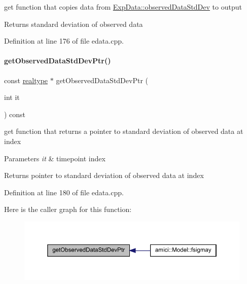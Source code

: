 get function that copies data from \mbox{\hyperlink{classamici_1_1_exp_data_aa097568cebb4be48c4c1dfaab0c2a159}{Exp\+Data\+::observed\+Data\+Std\+Dev}} to output

\begin{DoxyReturn}{Returns}
standard deviation of observed data 
\end{DoxyReturn}


Definition at line 176 of file edata.\+cpp.

\mbox{\label{classamici_1_1_exp_data_ad0ca0d6d8d5b6bb5587570d70bd3a4fc}} 
\paragraph{\texorpdfstring{get\+Observed\+Data\+Std\+Dev\+Ptr()}{getObservedDataStdDevPtr()}}
{\footnotesize\ttfamily const \mbox{\hyperlink{namespaceamici_a1bdce28051d6a53868f7ccbf5f2c14a3}{realtype}} $\ast$ get\+Observed\+Data\+Std\+Dev\+Ptr (\begin{DoxyParamCaption}\item[{int}]{it }\end{DoxyParamCaption}) const}

get function that returns a pointer to standard deviation of observed data at index


\begin{DoxyParams}{Parameters}
{\em it} & timepoint index \\
\hline
\end{DoxyParams}
\begin{DoxyReturn}{Returns}
pointer to standard deviation of observed data at index 
\end{DoxyReturn}


Definition at line 180 of file edata.\+cpp.

Here is the caller graph for this function\+:
\nopagebreak
\begin{figure}[H]
\begin{center}
\leavevmode
\includegraphics[width=350pt]{classamici_1_1_exp_data_ad0ca0d6d8d5b6bb5587570d70bd3a4fc_icgraph}
\end{center}
\end{figure}
\mbox{\label{classamici_1_1_exp_data_ae621c2d67f85f390d01a97658c956098}} 
